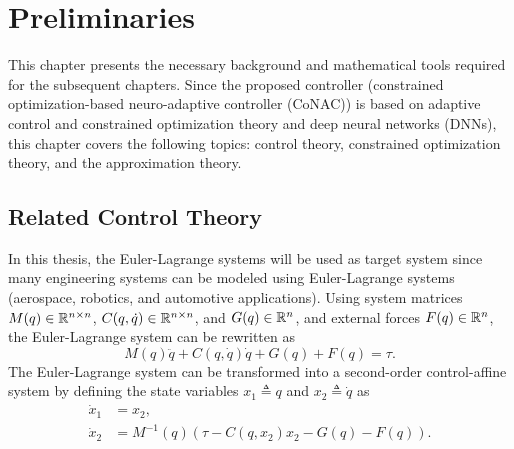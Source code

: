 
\chapter{Preliminaries} \label{chapter2}

This chapter presents the necessary background and mathematical tools required for the subsequent chapters.
Since the proposed controller (constrained optimization-based neuro-adaptive controller (CoNAC)) is based on adaptive control and constrained optimization theory and deep neural networks (DNNs), this chapter covers the following topics: control theory, constrained optimization theory, and the approximation theory.

\section{Related Control Theory} \label{chap2:sec:ctrl}


In this thesis, the Euler-Lagrange systems will be used as target system since many engineering systems can be modeled using Euler-Lagrange systems (\eg aerospace, robotics, and automotive applications).
Using system matrices $M(q)\in\mathbb{R}^{n\times n}$, $C(q,\dot{q})\in\mathbb{R}^{n\times n}$, and $G(q)\in\mathbb{R}^{n}$, and external forces $F(q)\in\mathbb{R}^n$, the Euler-Lagrange system can be rewritten as
\begin{equation}
    M(q)\ddot{q} + C(q,\dot{q})\dot{q} + G(q) +F(q)= \tau
    .
    \label{chap2:eq:EL}
\end{equation}
The Euler-Lagrange system can be transformed into a second-order control-affine system by defining the state variables $x_1\triangleq q$ and $x_2\triangleq \dot q$ as
\begin{equation}
    \begin{aligned}
        \dot{x}_1 &= x_2,\\
        \dot{x}_2 &= M^{-1}(q)(\tau - C(q,x_2)x_2 - G(q) - F(q))
        .
    \end{aligned}
\end{equation}


